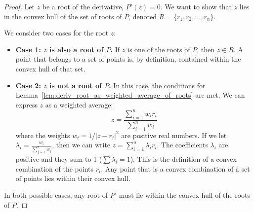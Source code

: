 \begin{proof}
  Let $z$ be a root of the derivative, $P'(z)=0$. We want to show that $z$ lies in the convex hull of the set of roots of $P$, denoted $R = \{r_1, r_2, \dots, r_n\}$.

  We consider two cases for the root $z$:

  \begin{itemize}
      \item \textbf{Case 1: $z$ is also a root of $P$.}
      If $z$ is one of the roots of $P$, then $z \in R$. A point that belongs to a set of points is, by definition, contained within the convex hull of that set.

      \item \textbf{Case 2: $z$ is not a root of $P$.}
      In this case, the conditions for Lemma~\ref{lem:deriv_root_as_weighted_average_of_roots} are met. We can express $z$ as a weighted average:
      $$ z = \frac{\sum_{i=1}^{n} w_i r_i}{\sum_{i=1}^{n} w_i} $$
      where the weights $w_i = 1/|z - r_i|^2$ are positive real numbers.
      If we let $\lambda_i = \frac{w_i}{\sum_{j=1}^{n} w_j}$, then we can write $z = \sum_{i=1}^{n} \lambda_i r_i$.
      The coefficients $\lambda_i$ are positive and they sum to 1 ($\sum \lambda_i = 1$). This is the definition of a convex combination of the points $r_i$. Any point that is a convex combination of a set of points lies within their convex hull.
  \end{itemize}
  In both possible cases, any root of $P'$ must lie within the convex hull of the roots of $P$.
\end{proof}
